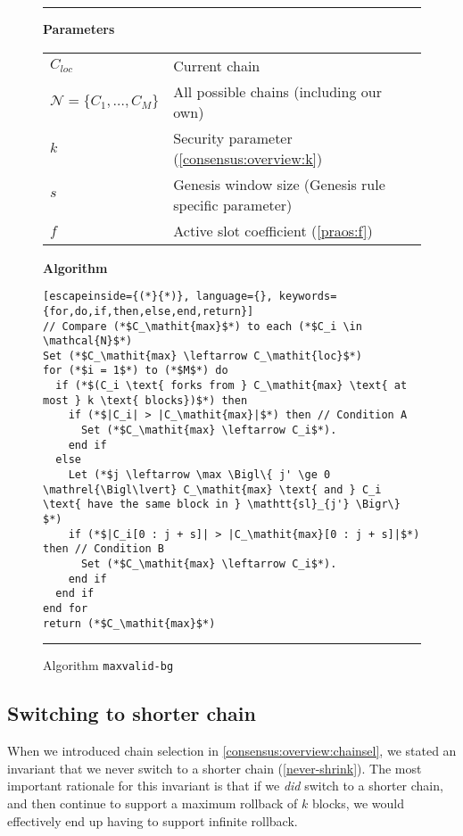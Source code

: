 \begin{figure}
\hrule

\textbf{Parameters} \\[0.5em]
\begin{tabular}{ll}
$C_\mathit{loc}$ & Current chain \\
$\mathcal{N} = \{C_1, \ldots, C_M\}$ & All possible chains (including our own) \\
$k$ & Security parameter (\cref{consensus:overview:k}) \\
$s$ & Genesis window size (Genesis rule specific parameter) \\
$f$ & Active slot coefficient (\cref{praos:f}) \\[1em]
\end{tabular}

\textbf{Algorithm}

\begin{lstlisting}[escapeinside={(*}{*)}, language={}, keywords={for,do,if,then,else,end,return}]
// Compare (*$C_\mathit{max}$*) to each (*$C_i \in \mathcal{N}$*)
Set (*$C_\mathit{max} \leftarrow C_\mathit{loc}$*)
for (*$i = 1$*) to (*$M$*) do
  if (*$(C_i \text{ forks from } C_\mathit{max} \text{ at most } k \text{ blocks})$*) then
    if (*$|C_i| > |C_\mathit{max}|$*) then // Condition A
      Set (*$C_\mathit{max} \leftarrow C_i$*).
    end if
  else
    Let (*$j \leftarrow \max \Bigl\{ j' \ge 0 \mathrel{\Bigl\lvert} C_\mathit{max} \text{ and } C_i \text{ have the same block in } \mathtt{sl}_{j'} \Bigr\} $*)
    if (*$|C_i[0 : j + s]| > |C_\mathit{max}[0 : j + s]|$*) then // Condition B
      Set (*$C_\mathit{max} \leftarrow C_i$*).
    end if
  end if
end for
return (*$C_\mathit{max}$*)
\end{lstlisting}

\hrule
\caption{\label{genesis:maxvalid-bg}Algorithm \texttt{maxvalid-bg}}
\end{figure}

\subsection{Switching to shorter chain}

When we introduced chain selection in \cref{consensus:overview:chainsel}, we
stated an invariant that we never switch to a shorter chain
(\cref{never-shrink}). The most important rationale for this invariant is that
if we \emph{did} switch to a shorter chain, and then continue to support a
maximum rollback of $k$ blocks, we would effectively end up having to
support infinite rollback.

